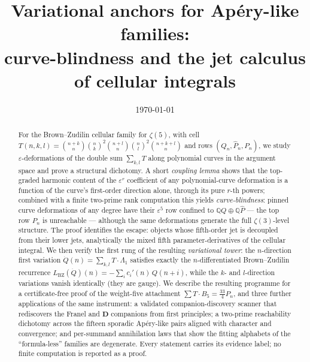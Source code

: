 \documentclass[11pt,reqno]{amsart}
\theoremstyle{plain}
\theoremstyle{definition}
\theoremstyle{remark}
\newcommand{\Q}{\mathbb{Q}}
\newcommand{\bin}[2]{\binom{#1}{#2}}
\newcommand{\Lbz}{L_{\mathrm{BZ}}}
\begin{document}
\title[Variational anchors for Ap\'ery-like families]
      {Variational anchors for Ap\'ery-like families:\\
       curve-blindness and the jet calculus of cellular integrals}

\author{}
\date{\today}

\begin{abstract}
For the Brown--Zudilin cellular family for $\zeta(5)$, with cell
$T(n,k,l)=\bin{n+k}{n}\bin nk^2\bin{n+l}{n}\bin nl^2\bin{n+k+l}{n}$ and rows
$(Q_n,\hat P_n,P_n)$, we study $\varepsilon$-deformations of the double sum
$\sum_{k,l}T$ along polynomial curves in the argument space and prove a
structural dichotomy. A short \emph{coupling lemma} shows that the top-graded
harmonic content of the $\varepsilon^{r}$ coefficient of any polynomial-curve
deformation is a function of the curve's first-order direction alone, through
its pure $r$-th powers; combined with a finite two-prime rank computation this
yields \emph{curve-blindness}: pinned curve deformations of any degree have
their $\varepsilon^{5}$ row confined to $\Q Q\oplus\Q\hat P$ --- the top row
$P_n$ is unreachable --- although the same deformations generate the full
$\zeta(3)$-level structure. The proof identifies the escape: objects whose
fifth-order jet is decoupled from their lower jets, analytically the mixed
fifth parameter-derivatives of the cellular integral. We then verify the
first rung of the resulting \emph{variational tower}: the $n$-direction first
variation $\dot Q(n)=\sum_{k,l}T\cdot\Lambda_1$ satisfies exactly the
$n$-differentiated Brown--Zudilin recurrence
$\Lbz(\dot Q)(n)=-\sum_i c_i'(n)\,Q(n+i)$, while the $k$- and $l$-direction
variations vanish identically (they are gauge). We describe the resulting
programme for a certificate-free proof of the weight-five attachment
$\sum T\cdot B_5=\tfrac{33}4P_n$, and three further applications of the same
instrument: a validated companion-discovery scanner that rediscovers the
Franel and $\mathbf D$ companions from first principles; a two-prime
reachability dichotomy across the fifteen sporadic Ap\'ery-like pairs aligned
with character and convergence; and per-summand annihilation laws that show
the fitting alphabets of the ``formula-less'' families are degenerate.
Every statement carries its evidence label; no finite computation is reported
as a proof.
\end{abstract}

\maketitle
\setcounter{tocdepth}{1}
\tableofcontents
\end{document}
